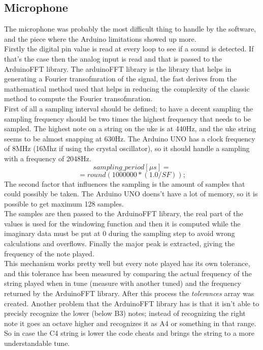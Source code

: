 \documentclass[a4paper,12pt]{article}
\begin{document}
\begin{multicols}{2}
\subsection{Microphone}
The microphone was probably the most difficult thing to handle by the software, and the piece where the Arduino limitations showed up more.\\
Firstly the digital pin value is read at every loop to see if a sound is detected. If that's the case then the analog input is read and that is passed to the ArduinoFFT library. The arduinoFFT library is the library that helps in generating a Fourier transofmration of the signal, the fast derives from the mathematical method used that helps in reducing the complexity of the classic method to compute the Fourier transofmration. \\
First of all a sampling interval should be defined; to have a decent sampling the sampling frequency should be two times the highest frequency that needs to be sampled. The highest note on a string on the uke is at 440Hz, and the uke string seems to be almost snapping at 630Hz. The Arduino UNO has a clock frequency of 8MHz (16Mhz if using the crystal oscillator), so it should handle a sampling with a frequency of 2048Hz.
\[sampling\_period[\mu s] =\]
\[=round(1000000 * (1.0 / SF));\]
The second factor that influences the sampling is the amount of samples that could possibly be taken. The Arduino UNO doens't have a lot of memory, so it is possible to get maximum 128 samples.\\
The samples are then passed to the ArduinoFFT library, the real part of the values is used for the windowing function and then it is computed while the imaginary data must be put at 0 during the sampling step to avoid wrong calculations and overflows. Finally the major peak is extracted, giving the frequency of the note played.\\
This mechanism works pretty well but every note played has its own tolerance, and this tolerance has been measured by comparing the actual frequency of the string played when in tune (measure with another tuned) and the frequency returned by the ArduinoFFT library. After this process the \textit{tolerances} array was created. Another problem that the ArduinoFFT library has is that it isn't able to precisly recognize the lower (below B3) notes; instead of recognizing the right note it goes an octave higher and recognizes it as A4 or something in that range. So in case the C4 string is lower the code cheats and brings the string to a more understandable tune.


\end{multicols}
\end{document}
